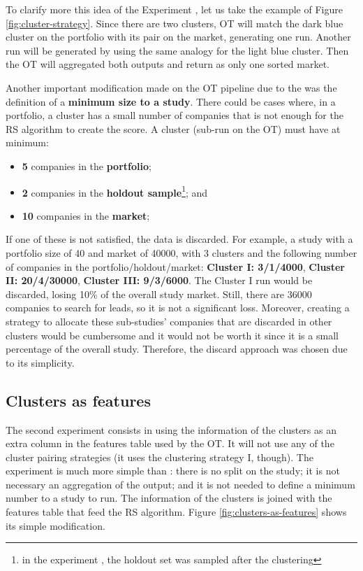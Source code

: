 To clarify more this idea of the Experiment \nameExperimentI{}, let us take the example of Figure \ref{fig:cluster-strategy}. Since there are two clusters, OT will match the dark blue cluster on the portfolio with its pair on the market, generating one run. Another run will be generated by using the same analogy for the light blue cluster. Then the OT will aggregated both outputs and return as only one sorted market.

Another important modification made on the OT pipeline due to the \nameExperimentI{} was the definition of a \textbf{minimum size to a study}. There could be cases where, in a portfolio, a cluster has a small number of companies that is not enough for the RS algorithm to create the score. A cluster (sub-run on the OT) must have at minimum:
\begin{itemize}
    \item \textbf{5} companies in the \textbf{portfolio};
    \item \textbf{2} companies in the \textbf{holdout sample}\footnote{in the experiment \nameExperimentI{}, the holdout set was sampled after the clustering}; and
    \item \textbf{10} companies in the \textbf{market};
\end{itemize}
If one of these is not satisfied, the data is discarded. For example, a study with a portfolio size of 40 and market of 40000, with 3 clusters and the following number of companies in the portfolio/holdout/market: \textbf{Cluster I: 3/1/4000}, \textbf{Cluster II: 20/4/30000}, \textbf{Cluster III: 9/3/6000}. The Cluster I run would be discarded, losing 10\% of the overall study market. Still, there are 36000 companies to search for leads, so it is not a significant loss. Moreover, creating a strategy to allocate these sub-studies' companies that are discarded in other clusters would be cumbersome and it would not be worth it since it is a small percentage of the overall study. Therefore, the discard approach was chosen due to its simplicity.

\subsection{Clusters as features}

The second experiment consists in using the information of the clusters as an extra column in the features table used by the OT. It will not use any of the cluster pairing strategies (it uses the clustering strategy I, though). The experiment \nameExperimentII{} is much more simple than \nameExperimentI{}: there is no split on the study; it is not necessary an aggregation of the output; and it is not needed to define a minimum number to a study to run. The information of the clusters is joined with the features table that feed the RS algorithm. Figure \ref{fig:clusters-as-features} shows its simple modification.

